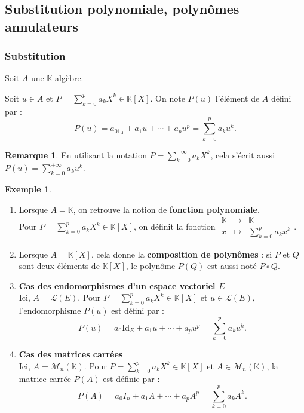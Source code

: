\documentclass[french]{article}
\newcommand{\K}{\mathbb{K}}
\theoremstyle{plain}
\theoremstyle{definition}
\newtheorem*{ex}{Exemple}
\newtheorem*{rmq}{Remarque}
\theoremstyle{remark}
\begin{document}
\subsection{Substitution polynomiale, polynômes annulateurs}

\subsubsection*{Substitution}

Soit $A$ une $\K$-algèbre.

\begin{dfn}
	Soit $u\in A$ et $P=\displaystyle\sum_{k=0}^{p}a_kX^k\in\K[X]$. On note $P(u)$ l'élément de $A$ défini par : $$P(u)=a_01_A+a_1u+\cdots+a_pu^p=\sum_{k=0}^{p}a_ku^k.$$
\end{dfn}

\begin{rmq}
	En utilisant la notation $P=\displaystyle\sum_{k=0}^{+\infty}a_kX^k$, cela s'écrit aussi $P(u)=\displaystyle\sum_{k=0}^{+\infty}a_ku^k$.
\end{rmq}

\begin{ex}
	\begin{enumerate}
		\item Lorsque $A=\K$, on retrouve la notion de \textbf{fonction polynomiale}. \\
		Pour $P=\displaystyle\sum_{k=0}^{p}a_kX^k\in\K[X]$, on définit la fonction $\displaystyle\begin{array}{rcl}
			\K&\longrightarrow&\K\\
			x&\longmapsto&\displaystyle\sum_{k=0}^{p}a_kx^k
		\end{array}$.
		\item Lorsque $A=\K[X]$, cela donne la \textbf{composition de polynômes} : si $P$ et $Q$ sont deux éléments de $\K[X]$, le polynôme $P(Q)$ est aussi noté $P\circ Q$.
		\item \textbf{Cas des endomorphismes d'un espace vectoriel $E$} \\
		Ici, $A=\mathcal{L}(E)$. Pour $P=\displaystyle\sum_{k=0}^{p}a_kX^k\in\K[X]$ et $u\in\mathcal{L}(E)$, l'endomorphisme $P(u)$ est défini par : $$P(u)=a_0\text{Id}_E+a_1u+\cdots+a_pu^p=\sum_{k=0}^{p}a_ku^k.$$
		\item \textbf{Cas des matrices carrées} \\
		Ici, $A=\mathcal{M}_n(\K)$. Pour $P=\displaystyle\sum_{k=0}^{p}a_kX^k\in\K[X]$ et $A\in\mathcal{M}_n(\K)$, la matrice carrée $P(A)$ est définie par : $$P(A)=a_0I_n+a_1A+\cdots+a_pA^p=\sum_{k=0}^{p}a_kA^k.$$
	\end{enumerate}
\end{ex}
\end{document}
